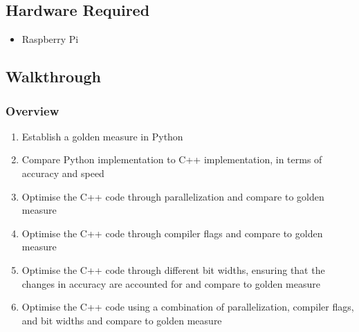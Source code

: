 \subsection{Hardware Required}
\begin{itemize}
    \item Raspberry Pi
\end{itemize}

\subsection{Walkthrough}
\subsubsection{Overview}
\begin{enumerate}
    \item Establish a golden measure in Python
    \item Compare Python implementation to C++ implementation, in terms of accuracy and speed
    \item Optimise the C++ code through parallelization and compare to golden measure
    \item Optimise the C++ code through compiler flags and compare to golden measure
    \item Optimise the C++ code through different bit widths, ensuring that the changes in accuracy are accounted for and compare to golden measure
    \item Optimise the C++ code using a combination of parallelization, compiler flags, and bit widths and compare to golden measure
\end{enumerate}

